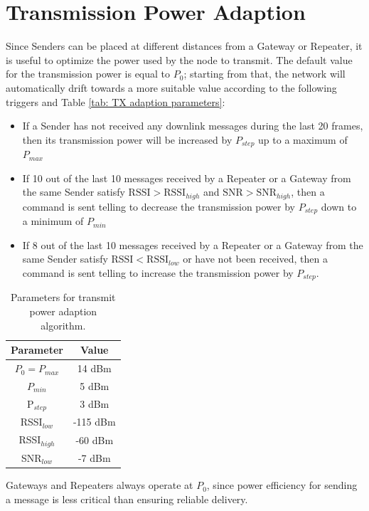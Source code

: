 \section{Transmission Power Adaption}
\label{sec: transmission power adaption}
Since Senders can be placed at different distances from a Gateway or Repeater, it is useful to optimize the power
used by the node to transmit. The default value for the transmission power is equal to $P_{0}$; starting from that, the
network will automatically drift towards a more suitable value according to the following triggers and Table \ref{tab:
TX adaption parameters}:
\begin{itemize}
    \item If a Sender has not received any downlink messages during
        the last 20 frames, then its transmission power will be increased by $P_{step}$ up to a maximum of $P_{max}$
    \item If 10 out of the last 10 messages received by a Repeater or a Gateway from the same Sender
        satisfy $\text{RSSI} > \text{RSSI}_{high}$ and $\text{SNR} > \text{SNR}_{high}$, then
        a command is sent telling to decrease the transmission power by $P_{step}$ down to a minimum of
        $P_{min}$
    \item If 8 out of the last 10 messages received by a Repeater or a Gateway from the same Sender
        satisfy $\text{RSSI} < \text{RSSI}_{low}$ or have not been received, then a command is sent telling to
        increase the transmission power by $P_{step}$.
\end{itemize}

\begin{table}[ht]
    \caption{Parameters for transmit power adaption algorithm.}
    \label{tab: TX adaption parameters}
    \centering
    \begin{tabular}{ |c|c| }
        \hline
        \textbf{Parameter} & \textbf{Value}\\
        \hline
        $P_{0} = P_{max}$ & 14 dBm\\
        \hline
        $P_{min}$ & 5 dBm\\
        \hline
        P$_{step}$ & 3 dBm\\
        \hline
        RSSI$_{low}$ & -115 dBm\\
        \hline
        RSSI$_{high}$ & -60 dBm\\
        \hline
        SNR$_{low}$ & -7 dBm\\
        \hline
    \end{tabular}
\end{table}
Gateways and Repeaters always operate at $P_{0}$, since power efficiency for sending a message is less critical
than ensuring reliable delivery.


